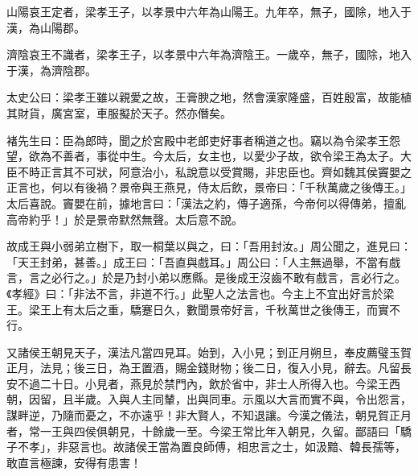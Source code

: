 \begin{pinyinscope}
山陽哀王定者，梁孝王子，以孝景中六年為山陽王。九年卒，無子，國除，地入于漢，為山陽郡。

濟陰哀王不識者，梁孝王子，以孝景中六年為濟陰王。一歲卒，無子，國除，地入于漢，為濟陰郡。

太史公曰：梁孝王雖以親愛之故，王膏腴之地，然會漢家隆盛，百姓殷富，故能植其財貨，廣宮室，車服擬於天子。然亦僭矣。

褚先生曰：臣為郎時，聞之於宮殿中老郎吏好事者稱道之也。竊以為令梁孝王怨望，欲為不善者，事從中生。今太后，女主也，以愛少子故，欲令梁王為太子。大臣不時正言其不可狀，阿意治小，私說意以受賞賜，非忠臣也。齊如魏其侯竇嬰之正言也，何以有後禍？景帝與王燕見，侍太后飲，景帝曰：「千秋萬歲之後傳王。」太后喜說。竇嬰在前，據地言曰：「漢法之約，傳子適孫，今帝何以得傳弟，擅亂高帝約乎！」於是景帝默然無聲。太后意不說。

故成王與小弱弟立樹下，取一桐葉以與之，曰：「吾用封汝。」周公聞之，進見曰：「天王封弟，甚善。」成王曰：「吾直與戲耳。」周公曰：「人主無過舉，不當有戲言，言之必行之。」於是乃封小弟以應縣。是後成王沒齒不敢有戲言，言必行之。《孝經》曰：「非法不言，非道不行。」此聖人之法言也。今主上不宜出好言於梁王。梁王上有太后之重，驕蹇日久，數聞景帝好言，千秋萬世之後傳王，而實不行。

又諸侯王朝見天子，漢法凡當四見耳。始到，入小見；到正月朔旦，奉皮薦璧玉賀正月，法見；後三日，為王置酒，賜金錢財物；後二日，復入小見，辭去。凡留長安不過二十日。小見者，燕見於禁門內，飲於省中，非士人所得入也。今梁王西朝，因留，且半歲。入與人主同輦，出與同車。示風以大言而實不與，令出怨言，謀畔逆，乃隨而憂之，不亦遠乎！非大賢人，不知退讓。今漢之儀法，朝見賀正月者，常一王與四侯俱朝見，十餘歲一至。今梁王常比年入朝見，久留。鄙語曰「驕子不孝」，非惡言也。故諸侯王當為置良師傅，相忠言之士，如汲黯、韓長孺等，敢直言極諫，安得有患害！


\end{pinyinscope}
